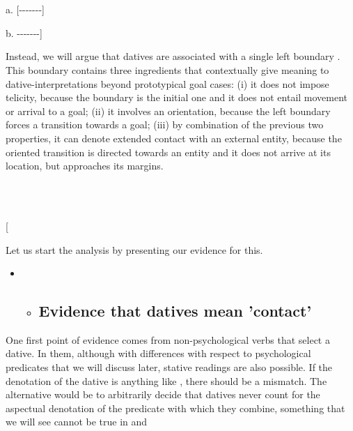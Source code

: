 \documentclass[output=paper,modfonts,nonflat]{langsci/langscibook}
\begin{document}
\ea%
    \label{ex:key:16}
    \gll\\
        \\
    \glt
    \z

          a. [-{}-{}-{}-{}-{}-{}-]

      b. -{}-{}-{}-{}-{}-{}-]

Instead, we will argue that datives are associated with a single left boundary . This boundary contains three ingredients that contextually give meaning to dative-interpretations beyond prototypical goal cases: (i) it does not impose telicity, because the boundary is the initial one and it does not entail movement or arrival to a goal; (ii) it involves an orientation, because the left boundary forces a transition towards a goal; (iii) by combination of the previous two properties, it can denote extended contact with an external entity, because the oriented transition is directed towards an entity and it does not arrive at its location, but approaches its margins.

\ea%
    \label{ex:key:17}
    \gll\\
        \\
    \glt
    \z

          [

Let us start the analysis by presenting our evidence for this. 

\begin{itemize}
\item \begin{itemize}
\item \subsection{Evidence that datives mean 'contact'}
\end{itemize}
\end{itemize}

One first point of evidence comes from non-psychological verbs that select a dative. In them, although with differences with respect to psychological predicates that we will discuss later, stative readings are also possible. If the denotation of the dative is anything like , there should be a mismatch. The alternative would be to arbitrarily decide that datives never count for the aspectual denotation of the predicate with which they combine, something that we will see cannot be true in  and 
\end{document}
